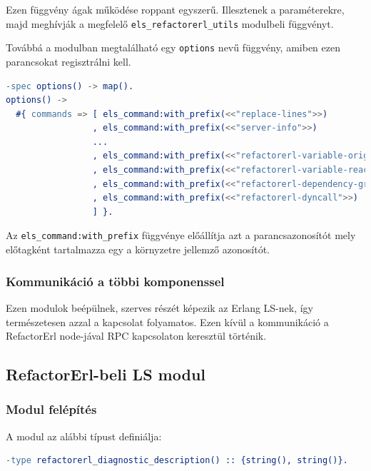 Ezen függvény ágak működése roppant egyszerű. Illesztenek a paraméterekre, majd meghívják a megfelelő \lstinline{els_refactorerl_utils} modulbeli függvényt.

Továbbá a modulban megtalálható egy \lstinline{options} nevű függvény, amiben ezen parancsokat regisztrálni kell.

\begin{lstlisting}[language={erlang}]
-spec options() -> map().
options() ->
  #{ commands => [ els_command:with_prefix(<<"replace-lines">>)
                 , els_command:with_prefix(<<"server-info">>)
                 ...
                 , els_command:with_prefix(<<"refactorerl-variable-origin">>)
                 , els_command:with_prefix(<<"refactorerl-variable-reach">>)
                 , els_command:with_prefix(<<"refactorerl-dependency-graph">>)
                 , els_command:with_prefix(<<"refactorerl-dyncall">>)
                 ] }.
\end{lstlisting}

Az \lstinline{els_command:with_prefix} függvénye előállítja azt a parancsazonosítót mely előtagként tartalmazza egy a környzetre jellemző azonosítót.

\subsubsection{Kommunikáció a többi komponenssel}

Ezen modulok beépülnek, szerves részét képezik az Erlang LS-nek, így természetesen azzal a kapcsolat folyamatos. Ezen kívül a kommunikáció a RefactorErl node-jával RPC kapcsolaton keresztül történik. 

\subsection{RefactorErl-beli LS modul}
\subsubsection{Modul felépítés}

\noindent A modul az alábbi típust definiálja: 
 
\begin{lstlisting}[language={erlang}]
-type refactorerl_diagnostic_description() :: {string(), string()}.
\end{lstlisting}
 





